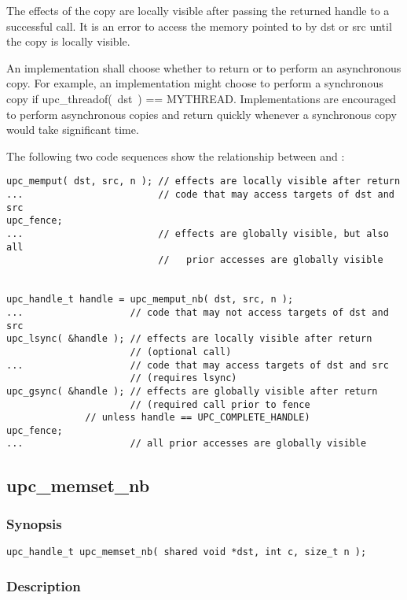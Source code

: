 \np The effects of the copy are locally visible after passing the
returned handle to a successful \lsync{} call.  It is an error to access the
memory pointed to by dst or src until the copy is locally visible.

\np An implementation shall choose whether to return \complete{} or
to perform an asynchronous copy.  For example, an implementation might
choose to perform a synchronous copy if upc\_threadof(~dst~) == MYTHREAD.
Implementations are encouraged to perform asynchronous copies and return
quickly whenever a synchronous copy would take significant time.

\np The following two code sequences show the relationship between
\memput{} and \function{}:

\begin{verbatim}
upc_memput( dst, src, n ); // effects are locally visible after return
...                        // code that may access targets of dst and src
upc_fence;                 
...                        // effects are globally visible, but also all
                           //   prior accesses are globally visible


upc_handle_t handle = upc_memput_nb( dst, src, n );
...                   // code that may not access targets of dst and src
upc_lsync( &handle ); // effects are locally visible after return
                      // (optional call)
...                   // code that may access targets of dst and src
                      // (requires lsync)
upc_gsync( &handle ); // effects are globally visible after return
                      // (required call prior to fence
		      // unless handle == UPC_COMPLETE_HANDLE)
upc_fence;
...                   // all prior accesses are globally visible
\end{verbatim}

\newpage
\subsection{upc\_memset\_nb}
\def\function{{\tt upc\_memset\_nb}}

\subsubsection{Synopsis}

\begin{verbatim}
upc_handle_t upc_memset_nb( shared void *dst, int c, size_t n );
\end{verbatim}

\subsubsection{Description}

